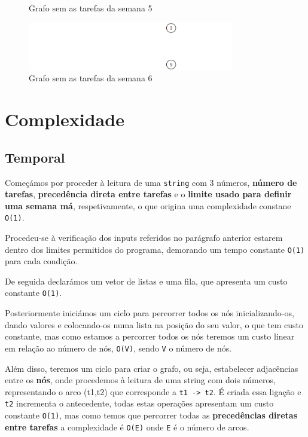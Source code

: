 \documentclass[11pt]{article}
\begin{document}
\begin{center}
\begin{figure}[h!]
        \caption{Grafo sem as tarefas da semana 5}
        \label{fig:grafo5}
    \end{figure}
    \begin{figure}[h!]
        \includegraphics[width=0.8\textwidth]{imgs/grafo6.png}
        \caption{Grafo sem as tarefas da semana 6}
        \label{fig:grafo6}
    \end{figure}
\end{center}

\section{Complexidade}
\subsection{Temporal}

\hspace{0,5cm}Começámos por proceder à leitura de uma \verb|string| com 3 números, \textbf{número de tarefas},
\textbf{precedência direta entre tarefas} e o \textbf{limite usado para definir uma semana má}, respetivamente,
o que origina uma complexidade constane \verb|O(1)|.

Procedeu-se à verificação dos inputs referidos no parágrafo anterior estarem dentro dos limites permitidos do
programa, demorando um tempo constante \verb|O(1)| para cada condição.

De seguida declarámos um vetor de listas e uma fila, que apresenta um custo constante \verb|O(1)|.

Posteriormente iniciámos um ciclo para percorrer todos os nós inicializando-os, dando valores e colocando-os numa
lista na posição do seu valor, o que tem custo constante, mas como estamos a percorrer todos os nós teremos um
custo linear em relação ao número de nós, \verb|O(V)|, sendo \verb|V| o número de nós.

Além disso, teremos um ciclo para criar o grafo, ou seja, estabelecer adjacências entre os 
\textbf{nós}, onde procedemos à leitura de uma string com dois números, representando o arco (t1,t2) que corresponde
a \verb|t1 -> t2|. É criada essa ligação e \verb|t2| incrementa o antecedente, todas estas operações apresentam
um custo constante \verb|O(1)|, mas como temos que percorrer todas as \textbf{precedências diretas entre
tarefas} a complexidade é \verb|O(E)| onde \verb|E| é o número de arcos.
\end{document}
